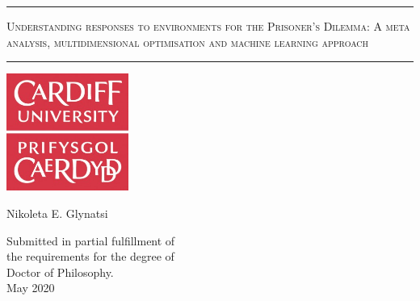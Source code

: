 \begin{titlepage}
	\begin{center}
		\vspace*{1cm}
		\vspace{10pt}

		\hrule
		\vspace{10pt}
		\huge
		\textsc{Understanding responses to environments for the Prisoner's Dilemma:
		A meta analysis, multidimensional optimisation and machine learning approach}
		\vspace{15pt}
		\hrule
		
		\vspace{2cm}

		\includegraphics[width=40mm]{cardiff_logo.jpg}
		\vspace{1cm}

		\LARGE
		Nikoleta E. Glynatsi
		
		\vspace{2cm}
		\large
		Submitted in partial fulfillment of\\ the requirements for the degree of\\[0.35em] Doctor of Philosophy. \\
		\vspace{1cm}
		May 2020

	\end{center}
\end{titlepage}